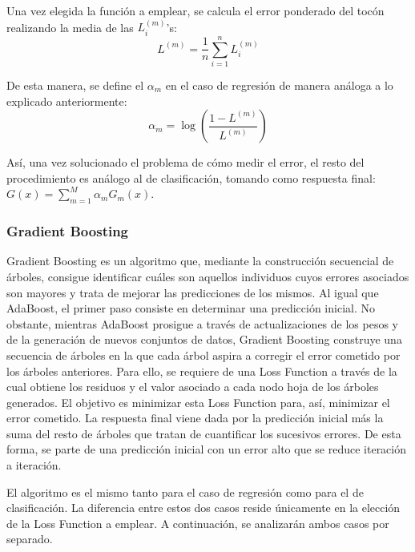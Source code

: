 \documentclass[12pt,twoside]{article}
\begin{document}
Una vez elegida la función a emplear, se calcula el error ponderado del tocón realizando la media de las $L_i^{(m)}$'s:
\begin{equation*}
L^{(m)} = \frac{1}{n}\sum_{i=1}^n L_i^{(m)}
\end{equation*}

De esta manera, se define el $\alpha_m$ en el caso de regresión de manera análoga a lo explicado anteriormente:
\begin{equation*}
\alpha_m = \log \left( \frac{1 - L^{(m)}}{L^{(m)}} \right)
\end{equation*}

Así, una vez solucionado el problema de cómo medir el error, el resto del procedimiento es análogo al de clasificación, tomando como respuesta final: $G(x) = \sum_{m = 1} ^M \alpha_m G_m(x)$.





\subsubsection{Gradient Boosting} \label{sec:GB}

Gradient Boosting \cite{FR03} es un algoritmo que, mediante la construcción secuencial de árboles, consigue identificar cuáles son aquellos individuos cuyos errores asociados son mayores y trata de mejorar las predicciones de los mismos. Al igual que AdaBoost, el primer paso consiste en determinar una predicción inicial. No obstante, mientras AdaBoost prosigue a través de actualizaciones de los pesos y de la generación de nuevos conjuntos de datos, Gradient Boosting construye una secuencia de árboles en la que cada árbol aspira a corregir el error cometido por los árboles anteriores. Para ello, se requiere de una Loss Function a través de la cual obtiene los residuos y el valor asociado a cada nodo hoja de los árboles generados. El objetivo es minimizar esta Loss Function para, así, minimizar el error cometido. La respuesta final viene dada por la predicción inicial más la suma del resto de árboles que tratan de cuantificar los sucesivos errores. De esta forma, se parte de una predicción inicial con un error alto que se reduce iteración a iteración.

El algoritmo es el mismo tanto para el caso de regresión como para el de clasificación. La diferencia entre estos dos casos reside únicamente en la elección de la Loss Function a emplear. A continuación, se analizarán ambos casos por separado.
\end{document}
